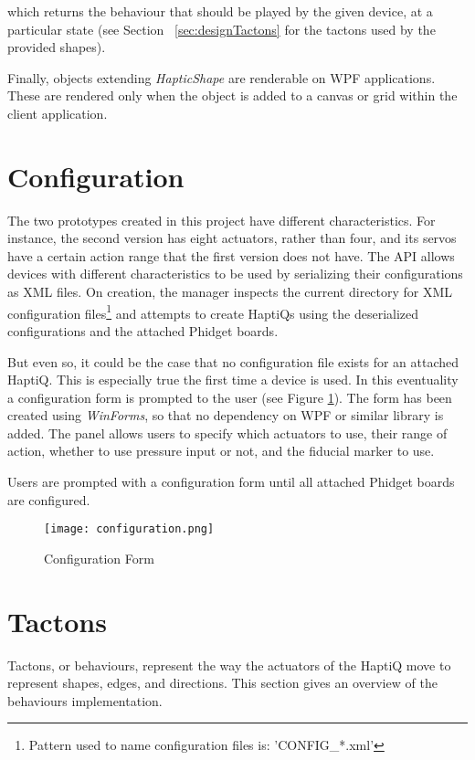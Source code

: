 which returns the behaviour that should be played by the given device, at a particular state (see Section ~\ref{sec:designTactons} for the tactons used by the provided shapes).

Finally, objects extending \textit{HapticShape} are renderable on WPF applications. These are rendered only when the object is added to a canvas or grid within the client application.

\section{Configuration}
\label{sec:configuration}

The two prototypes created in this project have different characteristics. For instance, the second version has eight actuators, rather than four, and its servos have a certain action range that the first version does not have. The API allows devices with different characteristics to be used by serializing their configurations as XML files. On creation, the manager inspects the current directory for XML configuration files\footnote{Pattern used to name configuration files is: 'CONFIG\_*.xml'} and attempts to create HaptiQs using the deserialized configurations and the attached Phidget boards.  

But even so, it could be the case that no configuration file exists for an attached HaptiQ. This is especially true the first time a device is used. In this eventuality a configuration form is prompted to the user (see Figure \ref{fig:configurationPanel}). The form has been created using \textit{WinForms}, so that no dependency on WPF or similar library is added. The panel allows users to specify which actuators to use, their range of action, whether to use pressure input or not, and the fiducial marker to use. 

Users are prompted with a configuration form until all attached Phidget boards are configured.

\begin{figure}[H]
  \centering
  \texttt{[image: configuration.png]}
  \caption{Configuration Form}
  \label{fig:configurationPanel}
\end{figure}

\section{Tactons}

Tactons, or behaviours, represent the way the actuators of the HaptiQ move to represent shapes, edges, and directions. This section gives an overview of the behaviours implementation.


